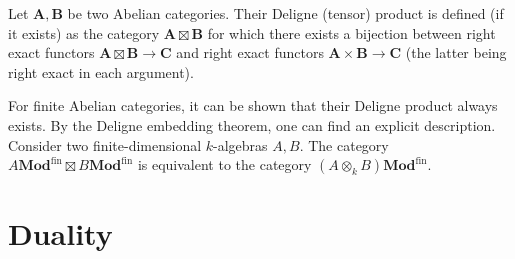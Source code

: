     \begin{construct}
        Let $\mathbf{A},\mathbf{B}$ be two Abelian categories. Their Deligne (tensor) product is defined (if it exists) as the category $\mathbf{A}\boxtimes\mathbf{B}$ for which there exists a bijection between right exact functors $\mathbf{A}\boxtimes\mathbf{B}\rightarrow\mathbf{C}$ and right exact functors $\mathbf{A}\times\mathbf{B}\rightarrow\mathbf{C}$ (the latter being right exact in each argument).

        For finite Abelian categories, it can be shown that their Deligne product always exists. By the Deligne embedding theorem, one can find an explicit description. Consider two finite-dimensional $k$-algebras $A,B$. The category $A\mathbf{Mod}^{\text{fin}}\boxtimes B\mathbf{Mod}^{\text{fin}}$ is equivalent to the category $(A\otimes_kB)\mathbf{Mod}^{\text{fin}}$.
    \end{construct}

\section{Duality}\label{section:duality}


